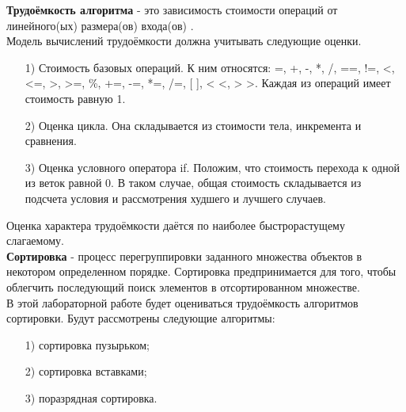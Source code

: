 \textbf{Трудоёмкость алгоритма} - это зависимость стоимости операций от линейного(ых) размера(ов) входа(ов) \cite{labor_int}.\\

Модель вычислений трудоёмкости должна учитывать следующие оценки.
\begin{itemize}
	\item[1)] Стоимость базовых операций. К ним относятся: =, +, -, *, /, ==, !=, <, <=, >, >=, \%, +=, -=, *=, /=, [ ], < <, > >. Каждая из операций имеет стоимость равную 1.
	\item[2)] Оценка цикла. Она складывается из стоимости тела, инкремента и сравнения. 
	\item[3)] Оценка условного оператора if. Положим, что стоимость перехода к одной из веток равной 0. В таком случае, общая стоимость складывается из подсчета условия и рассмотрения худшего и лучшего случаев.
\end{itemize}

Оценка характера трудоёмкости даётся по наиболее быстрорастущему слагаемому.\\

\textbf{Сортировка} - процесс перегруппировки заданного множества объектов в некотором определенном порядке. Сортировка предпринимается для того, чтобы облегчить последующий поиск элементов в отсортированном множестве.\\

В этой лабораторной работе будет оцениваться трудоёмкость алгоритмов сортировки.
Будут рассмотрены следующие алгоритмы:
\begin{itemize}
	\item[1)] сортировка пузырьком;
	\item[2)] сортировка вставками;
	\item[3)] поразрядная сортировка.
\end{itemize}